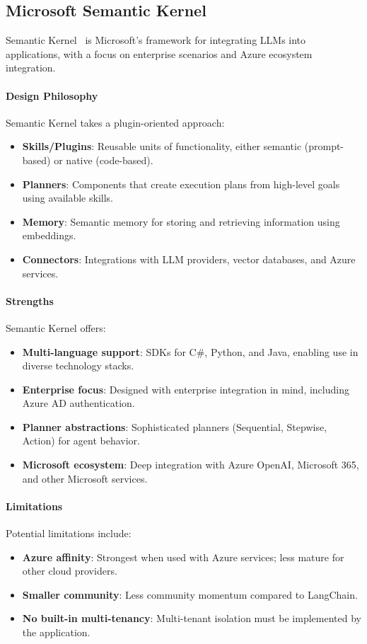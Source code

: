 \subsection{Microsoft Semantic Kernel}

Semantic Kernel~%
is Microsoft's framework for integrating LLMs into applications, with a focus on enterprise scenarios and Azure ecosystem integration.

\paragraph{Design Philosophy}
Semantic Kernel takes a plugin-oriented approach:
\begin{itemize}
    \item \textbf{Skills/Plugins}: Reusable units of functionality, either semantic (prompt-based) or native (code-based).
    \item \textbf{Planners}: Components that create execution plans from high-level goals using available skills.
    \item \textbf{Memory}: Semantic memory for storing and retrieving information using embeddings.
    \item \textbf{Connectors}: Integrations with LLM providers, vector databases, and Azure services.
\end{itemize}

\paragraph{Strengths}
Semantic Kernel offers:
\begin{itemize}
    \item \textbf{Multi-language support}: SDKs for C\#, Python, and Java, enabling use in diverse technology stacks.
    \item \textbf{Enterprise focus}: Designed with enterprise integration in mind, including Azure AD authentication.
    \item \textbf{Planner abstractions}: Sophisticated planners (Sequential, Stepwise, Action) for agent behavior.
    \item \textbf{Microsoft ecosystem}: Deep integration with Azure OpenAI, Microsoft 365, and other Microsoft services.
\end{itemize}

\paragraph{Limitations}
Potential limitations include:
\begin{itemize}
    \item \textbf{Azure affinity}: Strongest when used with Azure services; less mature for other cloud providers.
    \item \textbf{Smaller community}: Less community momentum compared to LangChain.
    \item \textbf{No built-in multi-tenancy}: Multi-tenant isolation must be implemented by the application.
\end{itemize}

